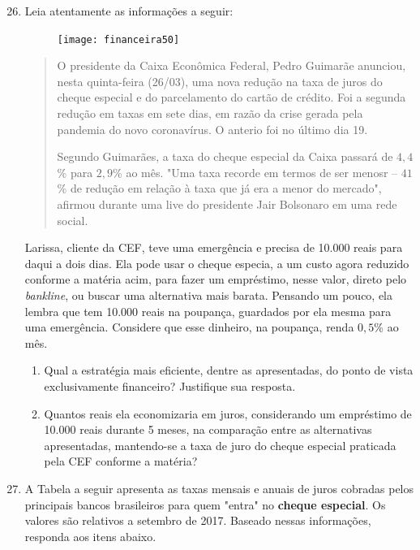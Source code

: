 \begin{enumerate}\setcounter{enumi}{25}
\item Leia atentamente as informações a seguir:

\begin{figure}[H]
\centering

\texttt{[image: financeira50]}
\end{figure}

\begin{quote}
O presidente da Caixa Econômica Federal, Pedro Guimarãe anunciou, nesta quinta-feira (26/03), uma nova redução na taxa de juros do cheque especial e do parcelamento do cartão de crédito. Foi a segunda redução em taxas em sete dias, em razão da crise gerada pela pandemia do novo coronavírus. O anterio foi no último dia 19.

Segundo Guimarães, a taxa do cheque especial da Caixa passará de $4{,}4$\% para $2{,}9$\% ao mês. "Uma taxa recorde em termos de ser menosr -- $41$\% de redução em relação à taxa que já era a menor do mercado", afirmou durante uma live do presidente Jair Bolsonaro em uma rede social.
\end{quote}

Larissa, cliente da CEF, teve uma emergência e precisa de 10.000 reais para daqui a dois dias. Ela pode usar o cheque especia, a um custo agora reduzido conforme a matéria acim, para fazer um empréstimo, nesse valor, direto pelo \textit{bankline}, ou buscar uma alternativa mais barata. Pensando um pouco, ela lembra que tem 10.000 reais na poupança, guardados por ela mesma para uma emergência. Considere que esse dinheiro, na poupança, renda $0{,}5$\% ao mês.
  \begin{enumerate}
    \item Qual a estratégia mais eficiente, dentre as apresentadas, do ponto de vista exclusivamente financeiro? Justifique sua resposta.
    \item Quantos reais ela economizaria em juros, considerando um empréstimo de 10.000 reais durante 5 meses, na comparação entre as alternativas apresentadas, mantendo-se a taxa de juro do cheque especial praticada pela CEF conforme a matéria?
  \end{enumerate}

\item A Tabela a seguir apresenta as taxas mensais e anuais de juros cobradas pelos principais bancos brasileiros para quem "entra" no \textbf{cheque especial}. Os valores são relativos a setembro de 2017. Baseado nessas informações, responda aos itens abaixo.


\end{enumerate}

